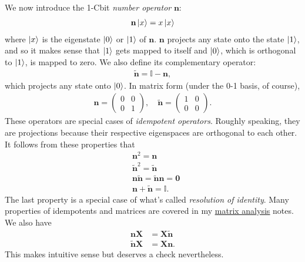 \documentclass{book}
\theoremstyle{definition}
\newcommand{\nn}{\nonumber}
\begin{document}
We now introduce the 1-Cbit \textit{number operator} $\mathbf{n}$:
\begin{align}
\mathbf{n}\ket{x} = x\ket{x}
\end{align}
where $\ket{x}$ is the eigenstate $\ket{0}$ or $\ket{1}$ of $\mathbf{n}$. $\mathbf{n}$ projects any state onto the state $\ket{1}$, and so it makes sense that $\ket{1}$ gets mapped to itself and $\ket{0}$, which is orthogonal to $\ket{1}$, is mapped to zero.  We also define its complementary operator:
\begin{align}
\tilde{\mathbf{n}} = \mathbb{I} - \mathbf{n},
\end{align}
which projects any state onto $\ket{0}$. In matrix form (under the 0-1 basis, of course), 
\begin{align}
\mathbf{n} = \begin{pmatrix}
0 & 0 \\ 0 & 1
\end{pmatrix}, \quad \tilde{\mathbf{n}} = \begin{pmatrix}
1&0\\0&0
\end{pmatrix}.
\end{align}
These operators are special cases of \textit{idempotent operators}. Roughly speaking, they are projections because their respective eigenspaces are orthogonal to each other. It follows from these properties that
\begin{align}
&\mathbf{n}^2  =  \mathbf{n} \nn\\
&\tilde{\mathbf{n}}^2  =  \tilde{\mathbf{n}} \nn\\
&\mathbf{n}\tilde{\mathbf{n}} =  \tilde{\mathbf{n}}\mathbf{n} = \mathbf{0}\nn\\
&\mathbf{n} + \tilde{\mathbf{n}}  = \mathbb{I}.
\end{align}
The last property is a special case of what's called \textit{resolution of identity}. Many properties of idempotents and matrices are covered in my \href{https://huanqbui.com/LaTeX 20projects/Matrix_Analysis/HuanBui_MatrixAnalysis.pdf}{\underline{matrix analysis}} notes.\\

We also have
\begin{align}
\mathbf{n}\mathbf{X} &= \mathbf{X}\tilde{\mathbf{n}}\nn\\
\tilde{\mathbf{n}}\mathbf{X} &= \mathbf{X}{\mathbf{n}}.
\end{align}
This makes intuitive sense but deserves a check nevertheless. \\
\end{document}
